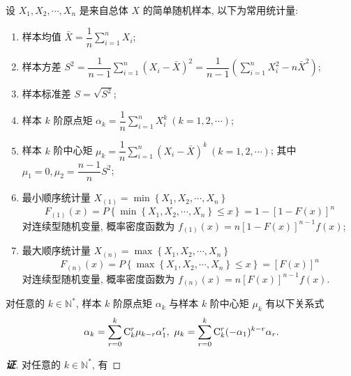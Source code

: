\begin{definition}[常用统计量]
    设 $ X_{1}, X_{2}, \cdots, X_{n} $ 是来自总体 $ X $ 的简单随机样本, 以下为常用统计量:
    \begin{enumerate}[label=(\arabic{*})]
        \item 样本均值 $ \bar{X}=\dfrac{1}{n} \displaystyle\sum_{i=1}^{n} X_{i} $;
        \item 样本方差 $S^{2}=\dfrac{1}{n-1} \displaystyle\sum_{i=1}^{n}\left(X_{i}-\bar{X}\right)^{2}=\dfrac{1}{n-1}\left(\displaystyle\sum_{i=1}^{n} X_{i}^{2}-n \bar{X}^{2}\right) $;
        \item 样本标准差 $ S=\sqrt{S^{2}} $;
        \item 样本 $ k $ 阶原点矩 $\alpha_{k}=\dfrac{1}{n} \displaystyle\sum_{i=1}^{n} X_{i}^{k}~(k=1,2, \cdots) $;
        \item 样本 $ k $ 阶中心矩 $\mu_{k}=\dfrac{1}{n} \displaystyle\sum_{i=1}^{n}\left(X_{i}-\bar{X}\right)^{k}~(k=1,2, \cdots) $;
        其中 $ \mu_{1}=0, \mu_{2}=\dfrac{n-1}{n} S^{2} $;
        \item 最小顺序统计量 $X_{(1)}=\min \left\{X_{1}, X_{2}, \cdots, X_{n}\right\}$
        $$F_{(1)}(x)=P\left\{\min \left\{X_{1}, X_{2}, \cdots, X_{n}\right\} \leqslant x\right\}=1-[1-F(x)]^{n}$$
        对连续型随机变量, 概率密度函数为 $f_{(1)}(x)=n[1-F(x)]^{n-1} f(x) $;
        \item 最大顺序统计量 $X_{(n)}=\max \left\{X_{1}, X_{2}, \cdots, X_{n}\right\}$
        $$F_{(n)}(x)=P\left\{\max \left\{X_{1}, X_{2}, \cdots, X_{n}\right\} \leqslant x\right\}=[F(x)]^{n}$$
        对连续型随机变量, 概率密度函数为 $f_{(n)}(x)=n[F(x)]^{n-1} f(x) .$
    \end{enumerate}
\end{definition}
\begin{theorem}[样本中心矩与原点矩的转换]
    对任意的 $k\in \mathbb{N}^*$, 样本 $ k $ 阶原点矩 $\alpha_{k}$ 与样本 $ k $ 阶中心矩 $\mu_{k}$
    有以下关系式  $$\displaystyle \alpha_k=\sum_{r=0}^{k} \mathrm{C}_k^r\mu_{k-r}\alpha_1^r,~\mu_k=\sum_{r=0}^{k} \mathrm{C}_k^r(-\alpha_1)^{k-r}\alpha_r.$$
\end{theorem}
\begin{proof}[{\songti \textbf{证}}]
    对任意的 $k\in \mathbb{N}^*$, 有
\end{proof}

